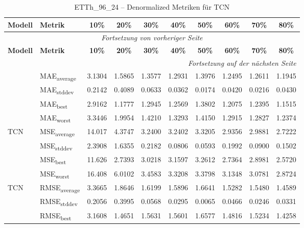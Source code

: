 {\small
\begin{longtable}{l l c c c c c c c c}
    \toprule
    \textbf{Modell} & \textbf{Metrik} & \textbf{10\%} & \textbf{20\%} & \textbf{30\%} & \textbf{40\%} & \textbf{50\%} & \textbf{60\%} & \textbf{70\%} & \textbf{80\%} \\
    \midrule
    \endfirsthead
    \multicolumn{10}{c}{\textit{Fortsetzung von vorheriger Seite}} \\
    \toprule
    \textbf{Modell} & \textbf{Metrik} & \textbf{10\%} & \textbf{20\%} & \textbf{30\%} & \textbf{40\%} & \textbf{50\%} & \textbf{60\%} & \textbf{70\%} & \textbf{80\%} \\
    \midrule
    \endhead
    \midrule
    \multicolumn{10}{r}{\textit{Fortsetzung auf der nächsten Seite}} \\
    \midrule
    \endfoot
    \bottomrule
    \caption{ETTh_96_24 -- Denormalized Metriken für TCN}
    \label{tab:etth_96_24_denormalized_tcn}
    \endlastfoot
\multirow{4}{*}{TCN} & MAE\textsubscript{average} & 3.1304 & 1.5865 & 1.3577 & 1.2931 & 1.3976 & 1.2495 & 1.2611 & 1.1945 \\
 & MAE\textsubscript{stddev} & 0.2142 & 0.4089 & 0.0633 & 0.0362 & 0.0174 & 0.0420 & 0.0216 & 0.0430 \\
 & MAE\textsubscript{best} & 2.9162 & 1.1777 & 1.2945 & 1.2569 & 1.3802 & 1.2075 & 1.2395 & 1.1515 \\
 & MAE\textsubscript{worst} & 3.3446 & 1.9954 & 1.4210 & 1.3293 & 1.4150 & 1.2915 & 1.2827 & 1.2374 \\
\cmidrule(lr){2-10}
\multirow{4}{*}{TCN} & MSE\textsubscript{average} & 14.017 & 4.3747 & 3.2400 & 3.2402 & 3.3205 & 2.9356 & 2.9881 & 2.7222 \\
 & MSE\textsubscript{stddev} & 2.3908 & 1.6355 & 0.2182 & 0.0806 & 0.0593 & 0.1992 & 0.0900 & 0.1502 \\
 & MSE\textsubscript{best} & 11.626 & 2.7393 & 3.0218 & 3.1597 & 3.2612 & 2.7364 & 2.8981 & 2.5720 \\
 & MSE\textsubscript{worst} & 16.408 & 6.0102 & 3.4583 & 3.3208 & 3.3798 & 3.1348 & 3.0781 & 2.8724 \\
\cmidrule(lr){2-10}
\multirow{4}{*}{TCN} & RMSE\textsubscript{average} & 3.3665 & 1.8646 & 1.6199 & 1.5896 & 1.6641 & 1.5282 & 1.5480 & 1.4589 \\
 & RMSE\textsubscript{stddev} & 0.2056 & 0.3995 & 0.0568 & 0.0295 & 0.0065 & 0.0466 & 0.0246 & 0.0331 \\
 & RMSE\textsubscript{best} & 3.1608 & 1.4651 & 1.5631 & 1.5601 & 1.6577 & 1.4816 & 1.5234 & 1.4258 \\

\end{longtable}}
